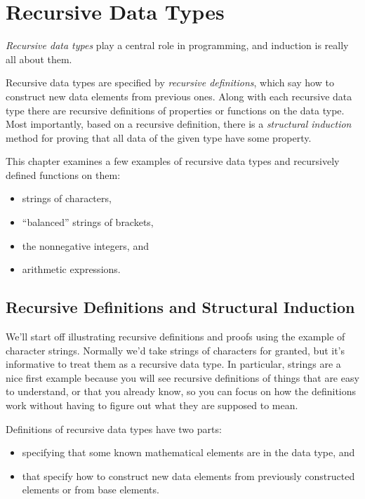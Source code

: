\chapter{Recursive Data Types}\label{recursive_data_chap}

\emph{Recursive data types}%
play a central role in programming, and induction is really all about them.

Recursive data types are specified by \emph{recursive definitions},
which say how to construct new data elements from previous ones.
Along with each recursive data type there are recursive definitions of
properties or functions on the data type.  Most importantly, based on
a recursive definition, there is a \emph{structural induction}%
method for proving that all data of the given type have some property.

This chapter examines a few examples of recursive data types and
recursively defined functions on them:
\begin{itemize}
\item strings of characters,
\item ``balanced'' strings of brackets,
\item the nonnegative integers, and
\item arithmetic expressions.
\end{itemize}

\section{Recursive Definitions and Structural Induction}

We'll start off illustrating recursive definitions and proofs using
the example of character strings.  Normally we'd take strings of
characters for granted, but it's informative to treat them as a
recursive data type.  In particular, strings are a nice first example
because you will see recursive definitions of things that are easy to
understand, or that you already know, so you can focus on how the
definitions work without having to figure out what they are supposed
to mean.

Definitions of recursive data types have two parts:
\begin{itemize}
\item {} specifying that some known
  mathematical elements are in the data type, and

\item {} that specify how to construct new data
  elements from previously constructed elements or from base elements.
\end{itemize}


